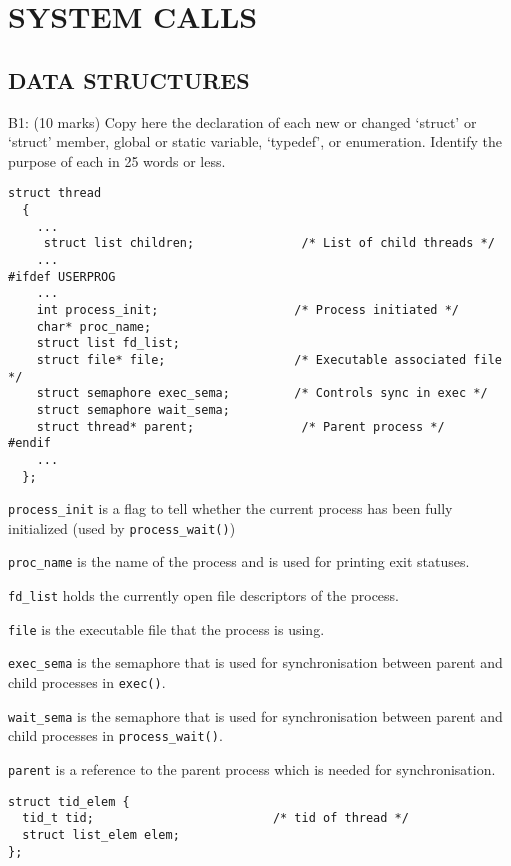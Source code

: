\section{SYSTEM CALLS}

\subsection*{DATA STRUCTURES}

\noindent B1: (10 marks)
Copy here the declaration of each new or changed `struct' or
`struct' member, global or static variable, `typedef', or
enumeration.  Identify the purpose of each in 25 words or less.

\begin{verbatim}
struct thread
  {
    ...
     struct list children;               /* List of child threads */
    ...
#ifdef USERPROG
    ...
    int process_init;                   /* Process initiated */
    char* proc_name;
    struct list fd_list;
    struct file* file;                  /* Executable associated file */
    struct semaphore exec_sema;         /* Controls sync in exec */
    struct semaphore wait_sema;
    struct thread* parent;               /* Parent process */
#endif
    ...    
  };
\end{verbatim}

\texttt{process\_init} is a flag to tell whether the current process has been fully initialized (used by \texttt{process\_wait()})

\texttt{proc\_name} is the name of the process and is used for printing exit statuses.

\texttt{fd\_list} holds the currently open file descriptors of the process.

\texttt{file} is the executable file that the process is using.

\texttt{exec\_sema} is the semaphore that is used for synchronisation between parent and child processes in \texttt{exec()}.

\texttt{wait\_sema} is the semaphore that is used for synchronisation between parent and child processes in \texttt{process\_wait()}.

\texttt{parent} is a reference to the parent process which is needed for synchronisation.


\begin{verbatim}
struct tid_elem {
  tid_t tid;                         /* tid of thread */
  struct list_elem elem;
};
\end{verbatim}

